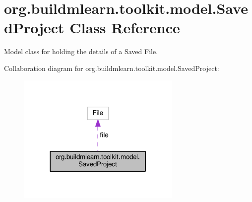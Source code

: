 \hypertarget{classorg_1_1buildmlearn_1_1toolkit_1_1model_1_1SavedProject}{}\section{org.\+buildmlearn.\+toolkit.\+model.\+Saved\+Project Class Reference}
\label{classorg_1_1buildmlearn_1_1toolkit_1_1model_1_1SavedProject}


Model class for holding the details of a Saved File.  




Collaboration diagram for org.\+buildmlearn.\+toolkit.\+model.\+Saved\+Project\+:
\nopagebreak
\begin{figure}[H]
\begin{center}
\leavevmode
\includegraphics[width=224pt]{classorg_1_1buildmlearn_1_1toolkit_1_1model_1_1SavedProject__coll__graph}
\end{center}
\end{figure}
